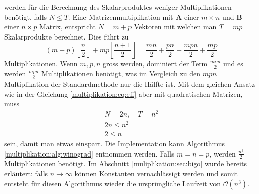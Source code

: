 werden für die Berechnung des Skalarproduktes weniger Multiplikationen benötigt, falls $N\leq T$.
Eine Matrizenmultiplikation mit $\mathbf{A}$ einer $m \times n$ und $\mathbf{B}$ einer $n \times p$ Matrix, entspricht $N=m+p$ Vektoren mit welchen man $T=mp$ Skalarprodukte berechnet.
Dies f\"uhrt zu
\begin{equation}
		(m+p) \left \lfloor \frac{n}{2} \right \rfloor + mp \left \lfloor \frac{n+1}{2} \right \rfloor = \frac{mn}{2} + \frac{pn}{2} + \frac{mpn}{2} + \frac{mp}{2}
\end{equation}
Multiplikationen.
Wenn $m,p,n$ gross werden, dominiert der Term $\frac{mpn}{2}$ und es werden $\frac{mpn}{2}$ Multiplikationen ben\"otigt, was im Vergleich zu den $mpn$ Multiplikation der Standardmethode nur die H\"alfte ist.
Mit dem gleichen Ansatz wie in der Gleichung \eqref{multiplikation:eq:eff} aber mit quadratischen Matrizen, muss
\begin{equation}
	\begin{split}
N=2n, \quad T = n^2 \\
	2n \leq n^2 \\
	2 \leq n
\end{split}
\end{equation}
sein, damit man etwas einspart.
Die Implementation kann Algorithmus \ref{multiplikation:alg:winograd} entnommen werden.
Falls $m=n=p$, werden $\frac{n^3}{2}$ Multiplikationen benötigt.
Im Abschnitt \ref{muliplikation:sec:bigo} wurde bereits erläutert: falls $n \rightarrow \infty$ können Konstanten vernachlässigt werden und
 somit entsteht für diesen Algorithmus wieder die ursprüngliche Laufzeit von $\mathcal{O}(n^3 )$.
